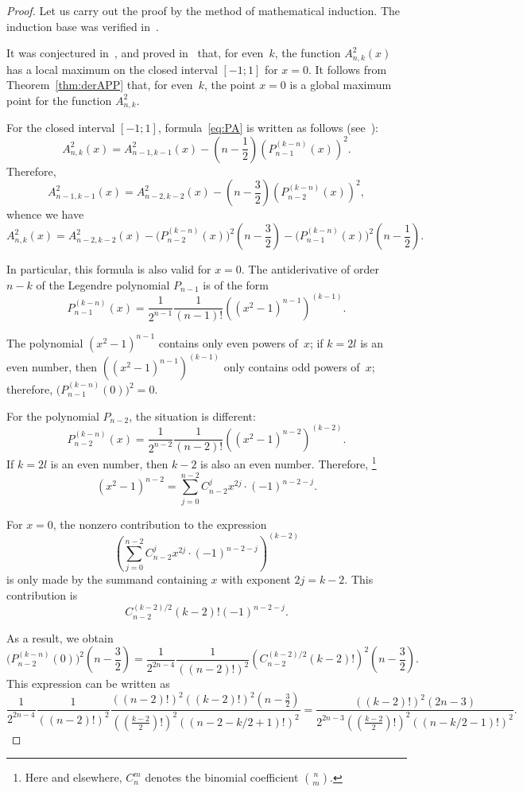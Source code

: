 \documentclass[12pt,oneside]{amsproc}
\numberwithin{equation}{section}
\begin{document}
\begin{proof}
 Let us carry out the proof by the method of mathematical induction.
 The induction base was verified in~\cite{Kalyab}.

 It was conjectured in~\cite{Kalyab},
and proved in~\cite{NazM} that, for even~$k$,
the function
$A^2_{n,k}(x)$
has a local maximum
on the closed interval
$[-1;1]$
for
$x=0$.
 It follows from Theorem~\ref{thm:derAPP}
that, for even~$k$,
the point
$x=0$
is a global maximum point for the function
$A^2_{n,k}$.

 For the closed interval
$[-1;1]$,
formula~\eqref{eq:PA}
is written as follows
(see~\cite{Kalyab}):
$$
A^2_{n,k}(x)=A^2_{n-1,k-1}(x)-\left(n-\frac12\right)\left(P_{n-1}^{(k-n)}(x)\right)^2.
$$
 Therefore,
$$
A^2_{n-1,k-1}(x)=A^2_{n-2,k-2}(x)-\left(n-\frac32\right)\left(P_{n-2}^{(k-n)}(x)\right)^2,
$$
whence we have
$$
A^2_{n,k}(x)=A^2_{n-2,k-2}(x)-\bigl(P_{n-2}^{(k-n)}(x)\bigr)^2\left(n-\frac32\right)-\bigl
(P_{n-1}^{(k-n)}(x)\bigr)^2\left(n-\frac12\right).
$$

 In particular, this formula is also valid
for
$x=0$.
  The antiderivative of order $n-k$
of the Legendre polynomial
$P_{n-1}$
is of the form
$$
P_{n-1}^{(k-n)}(x)=\dfrac{1}{2^{n-1}}\dfrac{1}{(n-1)!}\left((x^2-1)^{n-1}\right)^{(k-1)}.
$$

 The polynomial
$(x^2-1)^{n-1}$
contains only even powers of~$x$;
if
$k=2l$
is an even number,
then
$\left((x^2-1)^{n-1}\right)^{(k-1)}$
only contains odd powers of~$x$;
therefore,
$\bigl(P_{n-1}^{(k-n)}(0)\bigr)^2=0$.

 For the polynomial
$P_{n-2}$,
the situation is different:
$$
P_{n-2}^{(k-n)}(x)=\dfrac{1}{2^{n-2}}\dfrac{1}{(n-2)!}\left((x^2-1)^{n-2}\right)^{(k-2)}.
$$
 If
$k=2l$
is an even number,
then $k-2$
is also an even number.
 Therefore,%
\footnote{Here and elsewhere,
$C_n^m$
denotes the binomial coefficient
$\binom nm$.}
$$
(x^2-1)^{n-2}=\sum_{j=0}^{n-2}C_{n-2}^j x^{2j}\cdot (-1)^{n-2-j}.
$$

 For
$x=0$,
the nonzero contribution to the expression
$$
\left(\sum_{j=0}^{n-2}C_{n-2}^j x^{2j}\cdot (-1)^{n-2-j}\right)^{(k-2)}
$$
is only made by the summand
containing $x$
with exponent
$2j=k-2$.
 This contribution is
$$
C_{n-2}^{{(k-2)}/{2}}(k-2)!(-1)^{n-2-j}.
$$

 As a result, we obtain
$$
\bigl(P_{n-2}^{(k-n)}(0)\bigr)^2\left(n-\frac32\right)=\dfrac{1}{2^{2n-4}}\dfrac{1}{((n-2)
!)^2}
\left(C_{n-2}^{{(k-2)}/{2}}(k-2)!\right)^2\left(n-\frac32\right).
$$
 This expression can be written as
$$
\dfrac{1}{2^{2n-4}}\dfrac{1}{((n-2)!)^2}
\dfrac{((n-2)!)^2((k-2)!)^2\left(n-\frac32\right)}{((\frac{k-2}{2})!)^2((n-2-k/2+1)!)^2}=
\dfrac{((k-2)!)^2(2n-3)}{2^{2n-3}((\frac{k-2}{2})!)^2((n-k/2-1)!)^2}.
$$


\end{proof}
\end{document}
